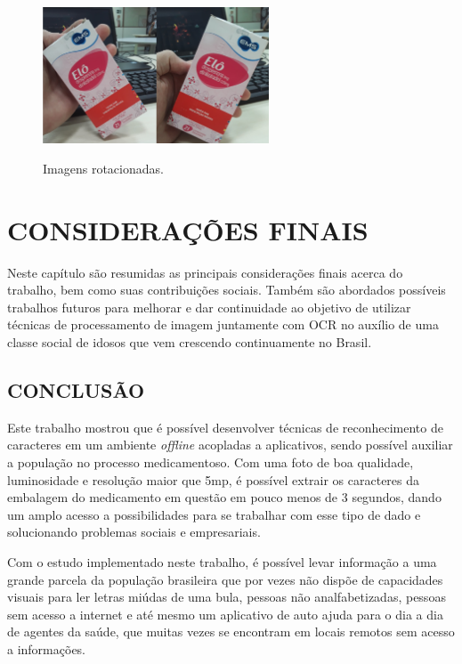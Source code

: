  \begin{figure}[h]
	\centering
	\includegraphics[width=0.6\textwidth]{Imagens/perspectiva2.jpg} %
	\caption[Imagens rotacionadas.]{Imagens rotacionadas.}
	\label{fig:rotacionadas}
\end{figure}

\chapter{CONSIDERAÇÕES FINAIS}\label{ch:intro}
Neste capítulo são resumidas as principais considerações finais acerca do trabalho, bem como suas contribuições sociais. Também são abordados possíveis trabalhos futuros para melhorar e dar continuidade ao objetivo de utilizar técnicas de processamento de imagem juntamente com OCR no auxílio de uma classe social de idosos que vem crescendo continuamente no Brasil.


\section{CONCLUSÃO}

Este trabalho mostrou que é possível desenvolver técnicas de reconhecimento de caracteres em um ambiente \textit{offline} acopladas a aplicativos, sendo possível auxiliar a população no processo medicamentoso. Com uma foto de boa qualidade, luminosidade e resolução maior que 5mp, é possível extrair os caracteres da embalagem do medicamento em questão em pouco menos de 3 segundos, dando um amplo acesso a possibilidades para se trabalhar com esse tipo de dado e solucionando problemas sociais e empresariais.

Com o estudo implementado neste trabalho, é possível levar informação a uma grande parcela da população brasileira que por vezes não dispõe de capacidades visuais para ler letras miúdas de uma bula, pessoas não analfabetizadas, pessoas sem acesso a internet e até mesmo um aplicativo de auto ajuda para o dia a dia de agentes da saúde, que muitas vezes se encontram em locais remotos sem acesso a informações.  

